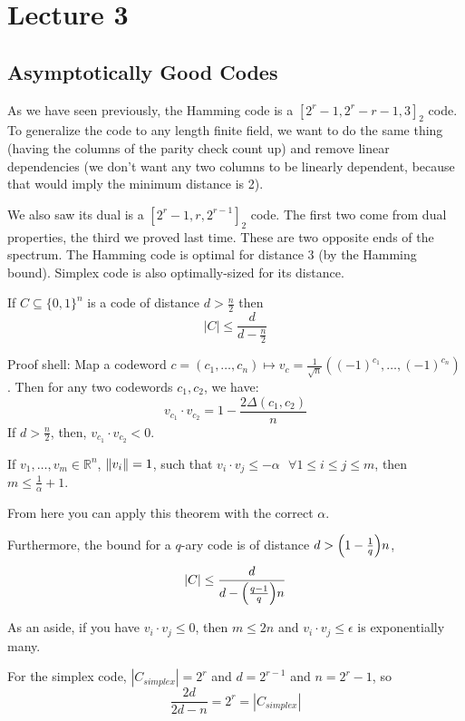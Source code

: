 \section{Lecture 3}

\subsection{Asymptotically Good Codes}
As we have seen previously, the Hamming code is a $[2^r - 1, 2^r - r - 1, 3]_2$ code.
To generalize the code to any length finite field, we want to do the same thing (having the columns of the parity check count up) and remove linear dependencies (we don't want any two columns to be linearly dependent, because that would imply the minimum distance is 2).

We also saw its dual is a $[2^r - 1, r, 2^{r - 1}]_2$ code. The first two come from dual properties, the third we proved last time.
These are two opposite ends of the spectrum. The Hamming code is optimal for distance 3 (by the Hamming bound).
Simplex code is also optimally-sized for its distance.

\begin{theorem}
    If $C \subseteq \{0, 1\}^n$ is a code of distance $d > \frac{n}{2}$ then
    \[ |C| \leq \frac{d}{d - \frac{n}{2}} \]

    Proof shell: Map a codeword $c = (c_1, \dots, c_n) \mapsto v_c = \frac{1}{\sqrt{n}} ((-1)^{c_1}, \dots, (-1)^{c_n})$.
    Then for any two codewords $c_1, c_2$, we have:
    \[ v_{c_1} \cdot v_{c_2} = 1 - \frac{2 \Delta(c_1, c_2)}{n} \]
    If $d > \frac{n}{2}$, then, $v_{c_1} \cdot v_{c_2} < 0$.

    \begin{lemma}
        If $v_1, \dots, v_m \in \mathbb{R}^n$, $\norm{v_i} = 1$, such that
        $v_i \cdot v_j \leq - \alpha \text{ } \forall 1 \leq i \leq j \leq m$,
        then $m \leq \frac{1}{\alpha} + 1$.
    \end{lemma}
    From here you can apply this theorem with the correct $\alpha$.

    Furthermore, the bound for a $q$-ary code is of distance $d > \qty(1 - \frac{1}{q})n$,
    \[ |C| \leq \frac{d}{d - \qty(\frac{q - 1}{q})n}\]
\end{theorem}

As an aside, if you have $v_i \cdot v_j \leq 0$, then $m \leq 2n$ and $v_i \cdot v_j \leq \epsilon$ is exponentially many.

For the simplex code, $|C_{simplex}| = 2^r$ and $d = 2^{r - 1}$ and $n = 2^r - 1$,
so
\[ \frac{2d}{2d - n} = 2^r = |C_{simplex}| \]

